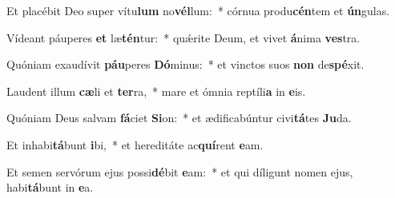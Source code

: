 \item Et placébit Deo super vítu\textbf{lum} no\textbf{vél}lum:~* córnua produ\textbf{cén}tem et \textbf{ún}gulas.
\item Vídeant páuperes \textbf{et} læ\textbf{tén}tur:~* quǽrite Deum, et vivet \textbf{á}nima \textbf{ves}tra.
\item Quóniam exaudívit \textbf{páu}peres \textbf{Dó}minus:~* et vinctos suos \textbf{non} de\textbf{spé}xit.
\item Laudent illum \textbf{cæ}li et \textbf{ter}ra,~* mare et ómnia reptíli\textbf{a} in \textbf{e}is.
\item Quóniam Deus salvam \textbf{fá}ciet \textbf{Si}on:~* et ædificabúntur civi\textbf{tá}tes \textbf{Ju}da.
\item Et inhabi\textbf{tá}bunt \textbf{i}bi,~* et hereditáte ac\textbf{quí}rent \textbf{e}am.
\item Et semen servórum ejus possi\textbf{dé}bit \textbf{e}am:~* et qui díligunt nomen ejus, habi\textbf{tá}bunt in \textbf{e}a.
